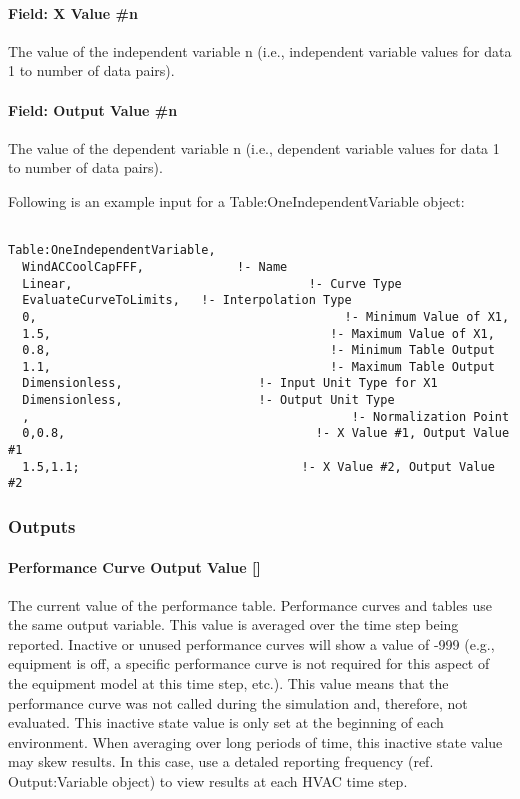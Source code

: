 \paragraph{Field: X Value \#n}\label{field-x-value-n}

The value of the independent variable n (i.e., independent variable values for data 1 to number of data pairs).

\paragraph{Field: Output Value \#n}\label{field-output-value-n}

The value of the dependent variable n (i.e., dependent variable values for data 1 to number of data pairs).

Following is an example input for a Table:OneIndependentVariable object:

\begin{lstlisting}

Table:OneIndependentVariable,
  WindACCoolCapFFF,             !- Name
  Linear,                                 !- Curve Type
  EvaluateCurveToLimits,   !- Interpolation Type
  0,                                           !- Minimum Value of X1,
  1.5,                                       !- Maximum Value of X1,
  0.8,                                       !- Minimum Table Output
  1.1,                                       !- Maximum Table Output
  Dimensionless,                   !- Input Unit Type for X1
  Dimensionless,                   !- Output Unit Type
  ,                                             !- Normalization Point
  0,0.8,                                   !- X Value #1, Output Value #1
  1.5,1.1;                               !- X Value #2, Output Value #2
\end{lstlisting}

\subsubsection{Outputs}\label{outputs-022}

\paragraph{\texorpdfstring{Performance Curve Output Value {[]}}{Performance Curve Output Value }}\label{performance-curve-output-value-000}

The current value of the performance table. Performance curves and tables use the same output variable. This value is averaged over the time step being reported. Inactive or unused performance curves will show a value of -999 (e.g., equipment is off, a specific performance curve is not required for this aspect of the equipment model at this time step, etc.). This value means that the performance curve was not called during the simulation and, therefore, not evaluated. This inactive state value is only set at the beginning of each environment. When averaging over long periods of time, this inactive state value may skew results. In this case, use a detaled reporting frequency (ref. Output:Variable object) to view results at each HVAC time step.

